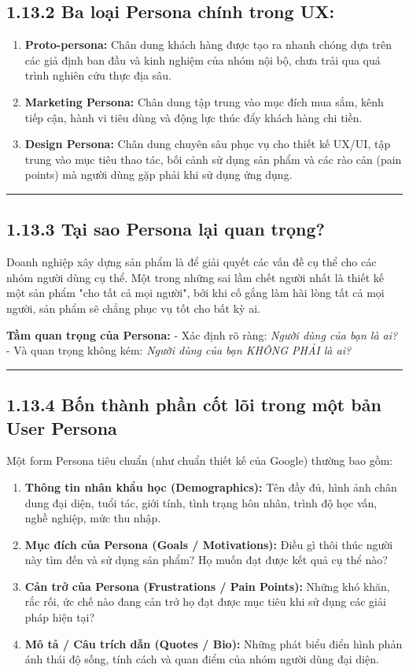 \documentclass[11pt,a4paper,oneside]{report}
\begin{document}
\subsection{1.13.2 Ba loại Persona chính trong UX:}
\begin{enumerate}[leftmargin=1.5em]
\item \textbf{Proto-persona:} Chân dung khách hàng được tạo ra nhanh chóng dựa trên các giả định ban đầu và kinh nghiệm của nhóm nội bộ, chưa trải qua quá trình nghiên cứu thực địa sâu.
\item \textbf{Marketing Persona:} Chân dung tập trung vào mục đích mua sắm, kênh tiếp cận, hành vi tiêu dùng và động lực thúc đẩy khách hàng chi tiền.
\item \textbf{Design Persona:} Chân dung chuyên sâu phục vụ cho thiết kế UX/UI, tập trung vào mục tiêu thao tác, bối cảnh sử dụng sản phẩm và các rào cản (pain points) mà người dùng gặp phải khi sử dụng ứng dụng.
\end{enumerate}

\bigskip\hrule\bigskip

\subsection{1.13.3 Tại sao Persona lại quan trọng?}
Doanh nghiệp xây dựng sản phẩm là để giải quyết các vấn đề cụ thể cho các nhóm người dùng cụ thể. Một trong những sai lầm chết người nhất là thiết kế một sản phẩm "cho tất cả mọi người", bởi khi cố gắng làm hài lòng tất cả mọi người, sản phẩm sẽ chẳng phục vụ tốt cho bất kỳ ai.


\begin{myquote}
\textbf{Tầm quan trọng của Persona:}
- Xác định rõ ràng: \textit{Người dùng của bạn là ai?}
- Và quan trọng không kém: \textit{Người dùng của bạn KHÔNG PHẢI là ai?}
\end{myquote}

\bigskip\hrule\bigskip

\subsection{1.13.4 Bốn thành phần cốt lõi trong một bản User Persona}
Một form Persona tiêu chuẩn (như chuẩn thiết kế của Google) thường bao gồm:

\begin{enumerate}[leftmargin=1.5em]
\item \textbf{Thông tin nhân khẩu học (Demographics):} Tên đầy đủ, hình ảnh chân dung đại diện, tuổi tác, giới tính, tình trạng hôn nhân, trình độ học vấn, nghề nghiệp, mức thu nhập.
\item \textbf{Mục đích của Persona (Goals / Motivations):} Điều gì thôi thúc người này tìm đến và sử dụng sản phẩm? Họ muốn đạt được kết quả cụ thể nào?
\item \textbf{Cản trở của Persona (Frustrations / Pain Points):} Những khó khăn, rắc rối, ức chế nào đang cản trở họ đạt được mục tiêu khi sử dụng các giải pháp hiện tại?
\item \textbf{Mô tả / Câu trích dẫn (Quotes / Bio):} Những phát biểu điển hình phản ánh thái độ sống, tính cách và quan điểm của nhóm người dùng đại diện.
\end{enumerate}
\end{document}
